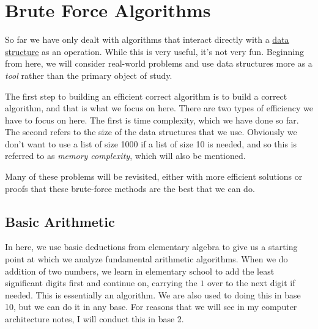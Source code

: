 \section{Brute Force Algorithms} 

  So far we have only dealt with algorithms that interact directly with a \hyperref[def:data-structure]{data structure} as an operation. While this is very useful, it's not very fun. Beginning from here, we will consider real-world problems and use data structures more as a \textit{tool} rather than the primary object of study. 

  The first step to building an efficient correct algorithm is to build a correct algorithm, and that is what we focus on here. There are two types of efficiency we have to focus on here. The first is time complexity, which we have done so far. The second refers to the size of the data structures that we use. Obviously we don't want to use a list of size 1000 if a list of size 10 is needed, and so this is referred to as \textit{memory complexity}, which will also be mentioned. 

  Many of these problems will be revisited, either with more efficient solutions or proofs that these brute-force methods are the best that we can do. 

\subsection{Basic Arithmetic}

  In here, we use basic deductions from elementary algebra to give us a starting point at which we analyze fundamental arithmetic algorithms. When we do addition of two numbers, we learn in elementary school to add the least significant digits first and continue on, carrying the $1$ over to the next digit if needed. This is essentially an algorithm. We are also used to doing this in base 10, but we can do it in any base. For reasons that we will see in my computer architecture notes, I will conduct this in base 2. 

